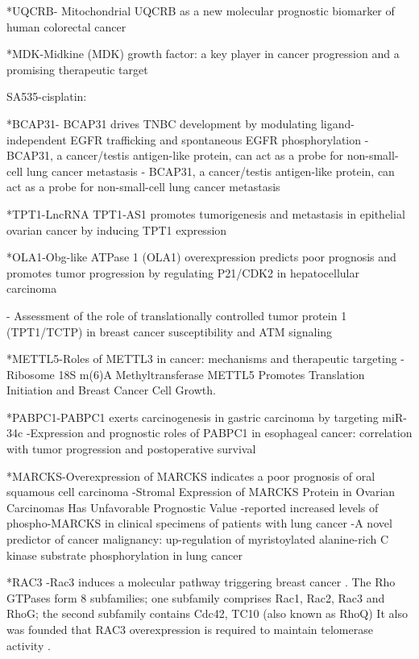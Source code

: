 *UQCRB-
Mitochondrial UQCRB as a new molecular prognostic biomarker of human colorectal cancer \cite{kim2017mitochondrial}

*MDK-Midkine (MDK) growth factor: a key player in cancer progression and a promising therapeutic target

SA535-cisplatin:

*BCAP31- BCAP31 drives TNBC development by modulating ligand-independent EGFR trafficking and spontaneous EGFR phosphorylation
-BCAP31, a cancer/testis antigen-like protein, can act as a probe for non-small-cell lung cancer metastasis
- BCAP31, a cancer/testis antigen-like protein, can act as a probe for non-small-cell lung cancer metastasis

*TPT1-LncRNA TPT1‐AS1 promotes tumorigenesis and metastasis in epithelial ovarian cancer by inducing TPT1 expression

*OLA1-Obg-like ATPase 1 (OLA1) overexpression predicts poor prognosis and promotes tumor progression by regulating P21/CDK2 in hepatocellular carcinoma

- Assessment of the role of translationally controlled tumor protein 1 (TPT1/TCTP) in breast cancer susceptibility and ATM signaling

*METTL5-Roles of METTL3 in cancer: mechanisms and therapeutic targeting
- Ribosome 18S m(6)A Methyltransferase METTL5 Promotes Translation Initiation and Breast Cancer Cell Growth.

*PABPC1-PABPC1 exerts carcinogenesis in gastric carcinoma by targeting miR-34c
-Expression and prognostic roles of PABPC1 in esophageal cancer: correlation with tumor progression and postoperative survival

*MARCKS-Overexpression of MARCKS indicates a poor prognosis of oral squamous cell carcinoma
-Stromal Expression of MARCKS Protein in Ovarian
Carcinomas Has Unfavorable Prognostic Value
-reported increased levels of phospho-MARCKS in clinical specimens of patients with lung cancer
-A novel predictor of cancer malignancy: up-regulation of myristoylated alanine-rich C kinase substrate phosphorylation in lung cancer

*RAC3 -Rac3 induces a molecular pathway triggering breast cancer \cite{gest2013rac3}.
 The Rho GTPases form 8 subfamilies; one subfamily comprises Rac1, Rac2, Rac3 and RhoG; the second subfamily contains Cdc42, TC10 (also known as RhoQ)
 It also was founded that RAC3 overexpression is required to maintain telomerase activity \cite{larrosa2015rac3, chan2005roles}.




